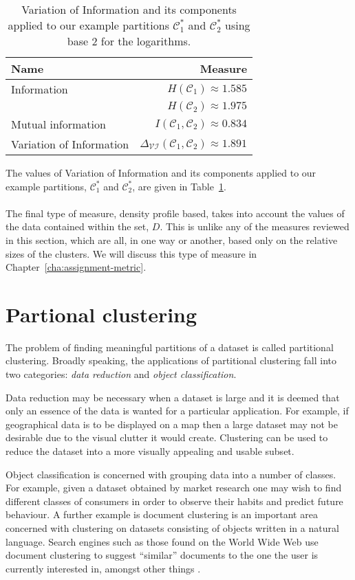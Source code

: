 \documentclass[a4paper]{report}
\newcommand{\dset}{D}
\newcommand{\clus}{\mathcal{C}}
\newcommand{\partcompare}[1]{\Delta_{\mathcal{#1}}(\clus_1,\clus_2)}
\begin{document}
\begin{table}
  \centering
  \begin{tabular}{lr}
    \toprule
    Name & Measure \\
    \midrule
    Information & $H(\clus_1) \approx 1.585$ \\
                & $H(\clus_2) \approx 1.975$ \\
    Mutual information & $I(\clus_1,\clus_2) \approx 0.834$ \\
    Variation of Information & $\partcompare{VI} \approx 1.891$
    \\
    \bottomrule
  \end{tabular}
  \caption{Variation of Information and its components applied to our example
    partitions  $\clus^*_1$ and $\clus^*_2$ using base 2 for the logarithms.}
  \label{tab:vi-comparison}
\end{table}

The values of Variation of Information and its components applied to our
example partitions, $\clus^*_1$ and $\clus^*_2$, are given in
Table~\ref{tab:vi-comparison}.
\\\\
\noindent The final type of measure, density profile based, takes into
account the values of the data contained within the set, $\dset$.  This is
unlike any of the measures reviewed in this section, which are all, in one way
or another, based only on the relative sizes of the clusters.  We will discuss
this type of measure in Chapter~\ref{cha:assignment-metric}.

\section{Partional clustering}
\label{sec:part-clust-algor}

The problem of finding meaningful partitions of a dataset is called
partitional clustering.  Broadly speaking, the applications of partitional
clustering fall into two categories: \textit{data reduction} and
\textit{object classification}.

Data reduction may be necessary when a dataset is large and it is deemed that
only an essence of the data is wanted for a particular application.  For
example, if geographical data is to be displayed on a map then a large dataset
may not be desirable due to the visual clutter it would create.  Clustering
can be used to reduce the dataset into a more visually appealing and usable
subset.

Object classification is concerned with grouping data into a number of
classes.  For example, given a dataset obtained by market research one may
wish to find different classes of consumers in order to observe their habits
and predict future behaviour.  A further example is document clustering is an
important area concerned with clustering on datasets consisting of objects
written in a natural language.  Search engines such as those found on the
World Wide Web use document clustering to suggest ``similar'' documents to the
one the user is currently interested in, amongst other things
\citep{steinbach2000comparison}.
\end{document}
